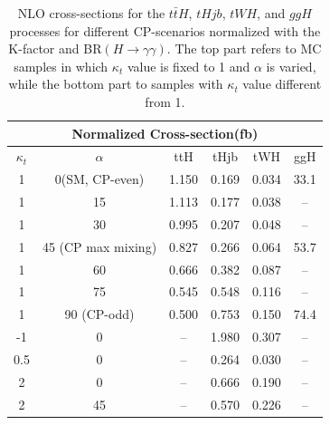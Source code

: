 \begin{table}
  \centering
  \begin{tabular}{|c|c||c|c|c|c|}
    \hline
    \multicolumn{6}{|c|}{Normalized Cross-section(fb)} \\
    \hline \hline
    $\kappa_t$ & $\alpha$ & ttH & tHjb & tWH & ggH\\
    \hline
    1 & 0(SM, CP-even)  & 1.150 & 0.169 & 0.034 & 33.1 \\
    1 & 15              & 1.113 & 0.177 & 0.038 & -- \\
    1 & 30              & 0.995 & 0.207 & 0.048 & -- \\
    1 & 45 (CP max mixing)      & 0.827 & 0.266 & 0.064 & 53.7 \\
    1 & 60              & 0.666 & 0.382 & 0.087 & -- \\
    1 & 75              & 0.545 & 0.548 & 0.116 & -- \\
    1 & 90 (CP-odd)     & 0.500 & 0.753 & 0.150 & 74.4 \\
    \hline \hline
    -1 & 0    & -- & 1.980 & 0.307 & -- \\
    0.5 & 0   & -- & 0.264 & 0.030 & -- \\
    2 & 0     & -- & 0.666 & 0.190 & -- \\
    2 & 45    & -- & 0.570 & 0.226 & -- \\
    \hline
  \end{tabular}
  \caption{NLO cross-sections for the $t\bar{t}H$, $tHjb$, $tWH$, and $ggH$ processes for different CP-scenarios normalized with the K-factor and BR$(H\rightarrow\gamma\gamma)$. The top part refers to MC samples in which $\kappa_{t}$ value is fixed to 1 and $\alpha$ is varied, while the bottom part to samples with $\kappa_{t}$ value different from 1.}
  \label{tab:MCsamples_XS_norm}
\end{table}

